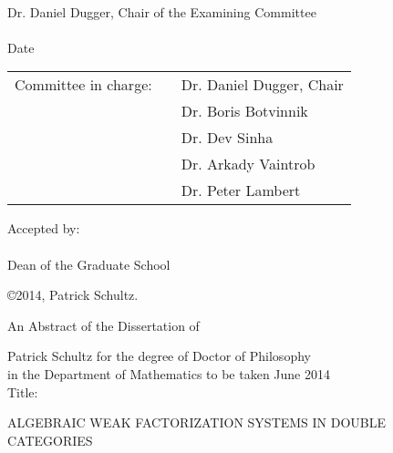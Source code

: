 \documentclass[11pt]{UOthesis}
\begin{document}
	{\singlespace
	\underline{\hspace*{5in}} \\
	Dr. Daniel Dugger, 	%
	Chair of the Examining Committee \\[36pt]
	\underline{\hspace*{3in}}\\
	 Date \\[36pt]
 
 
	 \begin{tabular}{lcl}
	\hspace*{-1em}    %
	 Committee in charge: & \hspace*{.5in}
	 	& Dr. Daniel Dugger, Chair\\
	 	&& Dr. Boris Botvinnik\\
	 	&& Dr. Dev Sinha\\
	 	&& Dr. Arkady Vaintrob\\
	 	&& Dr. Peter Lambert\\[24pt]
	\end{tabular}

	Accepted by: \\[36pt]
	\underline{\hspace*{5in}}\\
		Dean of the Graduate School
	}
	\newpage



\vspace*{1.5in}
\begin{center}
\copyright 2014, Patrick Schultz.%
\end{center}
\newpage


	\TOP

	\begin{center}
	An Abstract of the Dissertation of \\
	\end{center}
	Patrick Schultz %
	  	\hfill	for the degree of	\hfill Doctor of Philosophy\\ 
	in the Department of Mathematics \hfill to be taken \hfill 
	June 2014 \\ %
	Title: \parbox[t]{5.4in}{ALGEBRAIC WEAK FACTORIZATION SYSTEMS IN DOUBLE CATEGORIES} \\[9pt]
\end{document}
